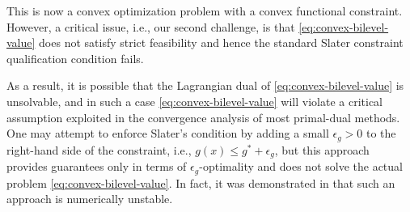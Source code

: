 \documentclass[11pt,oneside]{article}
\theoremstyle{plain}
\theoremstyle{plain}
\theoremstyle{plain}%
\begin{document}
This is now a convex optimization problem with a convex functional constraint. However, a critical issue, i.e., our second challenge, is that \eqref{eq:convex-bilevel-value} does not satisfy strict feasibility and hence the standard Slater constraint qualification condition fails. {As a result, it is possible that the Lagrangian dual of \eqref{eq:convex-bilevel-value} is unsolvable, and in such a case \eqref{eq:convex-bilevel-value} will violate a critical assumption exploited in the convergence analysis of most primal-dual methods. One may attempt to enforce Slater's condition by adding a small $\epsilon_g > 0$ to the right-hand side of the constraint, i.e., $g(x) \leq g^* + \epsilon_g$, but this approach provides guarantees only  in terms of $\epsilon_g$-optimality and does not solve the actual problem \eqref{eq:convex-bilevel-value}. 
In fact, it was demonstrated in \citep[Appendix D]{JiangEtAl2023} that such an approach is numerically unstable.

}
\end{document}
